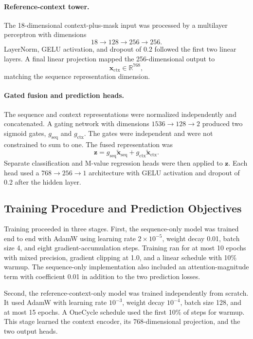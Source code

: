 \documentclass[10pt,letterpaper,twocolumn]{article}
\begin{document}
\paragraph{Reference-context tower.}
The 18-dimensional context-plus-mask input was processed by a multilayer
perceptron with dimensions
\[
18\rightarrow128\rightarrow256\rightarrow256.
\]
LayerNorm, GELU activation, and dropout of 0.2 followed the first two
linear layers. A final linear projection mapped the 256-dimensional
output to
\[
\mathbf x_{\mathrm{ctx}}\in\mathbb R^{768},
\]
matching the sequence representation dimension.

\paragraph{Gated fusion and prediction heads.}
The sequence and context representations were normalized independently
and concatenated. A gating network with dimensions
$1536\rightarrow128\rightarrow2$ produced two sigmoid gates,
$g_{\mathrm{seq}}$ and $g_{\mathrm{ctx}}$. The gates were independent
and were not constrained to sum to one. The fused representation was
\[
\mathbf z=
 g_{\mathrm{seq}}\widetilde{\mathbf x}_{\mathrm{seq}}
 +g_{\mathrm{ctx}}\widetilde{\mathbf x}_{\mathrm{ctx}}.
\]
Separate classification and M-value regression heads were then applied
to $\mathbf z$. Each head used a $768\rightarrow256\rightarrow1$
architecture with GELU activation and dropout of 0.2 after the hidden
layer.

\subsection{Training Procedure and Prediction Objectives}
\label{sec:training}

Training proceeded in three stages. First, the sequence-only model was
trained end to end with AdamW using learning rate $2\times10^{-5}$,
weight decay 0.01, batch size 4, and eight gradient-accumulation steps.
Training ran for at most 10 epochs with mixed precision, gradient
clipping at 1.0, and a linear schedule with 10\% warmup. The
sequence-only implementation also included an attention-magnitude term
with coefficient 0.01 in addition to the two prediction losses.

Second, the reference-context-only model was trained independently from
scratch. It used AdamW with learning rate $10^{-3}$, weight decay
$10^{-4}$, batch size 128, and at most 15 epochs. A OneCycle schedule
used the first 10\% of steps for warmup. This stage learned the context
encoder, its 768-dimensional projection, and the two output heads.
\end{document}
